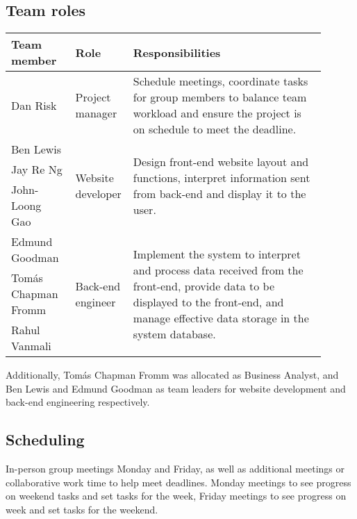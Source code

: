 \documentclass[10pt]{article}
\begin{document}
\subsection{Team roles}\vspace{-2mm}

\begin{table}[H]
\begin{tabular}{p{0.2\linewidth}|p{0.1\linewidth}|p{0.6\linewidth}}
    \hline
    \textbf{Team member} & \textbf{Role}                      & \textbf{Responsibilities} \\ \hline\hline
    Dan Risk             & Project manager                    &
        Schedule meetings, coordinate tasks for group members to balance team
        workload and ensure the project is on schedule to meet the deadline.
    \\ \hline
    Ben Lewis            & \multirow{3}{1\linewidth}{Website developer} & \multirow{3}{1\linewidth}{
        Design front-end website layout and functions, interpret information
        sent from back-end and display it to the user.
    } \\
    Jay Re Ng            & \\
    John-Loong Gao       & \\ \hline
    Edmund Goodman       & \multirow{3}{1\linewidth}{Back-end engineer} & \multirow{3}{1\linewidth}{
        Implement the system to interpret and process data received from the
        front-end, provide data to be displayed to the front-end, and manage
        effective data storage in the system database.
    } \\
    Tomás Chapman Fromm  & \\
    Rahul Vanmali        & \\
    \hline
\end{tabular}
\end{table}

Additionally, Tomás Chapman Fromm was allocated as Business Analyst, and Ben
Lewis and Edmund Goodman as team leaders for website development and back-end
engineering respectively.

\vspace{-4mm}\subsection{Scheduling}\vspace{-2mm}
In-person group meetings Monday and Friday, as well as additional meetings or
collaborative work time to help meet deadlines. Monday meetings to see progress
on weekend tasks and set tasks for the week, Friday meetings to see progress on
week and set tasks for the weekend.



\end{document}
